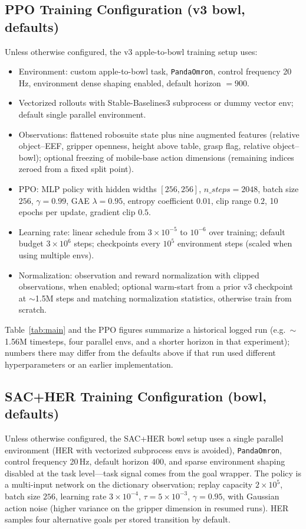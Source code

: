 \documentclass[11pt,a4paper]{article}
\begin{document}
\subsection{PPO Training Configuration (v3 bowl, defaults)}
Unless otherwise configured, the v3 apple-to-bowl training setup uses:
\begin{itemize}
    \item Environment: custom apple-to-bowl task, \texttt{PandaOmron}, control frequency 20\,Hz, environment dense shaping enabled, default horizon \(=900\).
    \item Vectorized rollouts with Stable-Baselines3 subprocess or dummy vector env; default single parallel environment.
    \item Observations: flattened robosuite state plus nine augmented features (relative object--EEF, gripper openness, height above table, grasp flag, relative object--bowl); optional freezing of mobile-base action dimensions (remaining indices zeroed from a fixed split point).
    \item PPO: MLP policy with hidden widths \([256,256]\), \(n\_steps=2048\), batch size \(256\), \(\gamma=0.99\), GAE \(\lambda=0.95\), entropy coefficient \(0.01\), clip range \(0.2\), 10 epochs per update, gradient clip \(0.5\).
    \item Learning rate: linear schedule from \(3\times10^{-5}\) to \(10^{-6}\) over training; default budget \(3\times10^{6}\) steps; checkpoints every \(10^{5}\) environment steps (scaled when using multiple envs).
    \item Normalization: observation and reward normalization with clipped observations, when enabled; optional warm-start from a prior v3 checkpoint at \(\sim\)1.5M steps and matching normalization statistics, otherwise train from scratch.
\end{itemize}
\noindent Table~\ref{tab:main} and the PPO figures summarize a historical logged run (e.g.\ \(\sim\)1.56M timesteps, four parallel envs, and a shorter horizon in that experiment); numbers there may differ from the defaults above if that run used different hyperparameters or an earlier implementation.

\subsection{SAC+HER Training Configuration (bowl, defaults)}
Unless otherwise configured, the SAC+HER bowl setup uses a single parallel environment (HER with vectorized subprocess envs is avoided), \texttt{PandaOmron}, control frequency 20\,Hz, default horizon \(400\), and sparse environment shaping disabled at the task level---task signal comes from the goal wrapper. The policy is a multi-input network on the dictionary observation; replay capacity \(2\times10^{5}\), batch size \(256\), learning rate \(3\times10^{-4}\), \(\tau=5\times10^{-3}\), \(\gamma=0.95\), with Gaussian action noise (higher variance on the gripper dimension in resumed runs). HER samples four alternative goals per stored transition by default.
\end{document}
